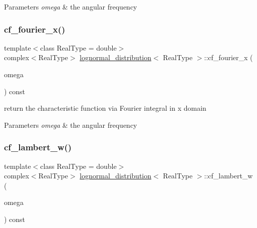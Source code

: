 \begin{DoxyParams}{Parameters}
{\em omega} & the angular frequency \\
\hline
\end{DoxyParams}
\mbox{\label{structlognormal__distribution_adace4ecb55c85b772702ec91a9f5b559}} 
\subsubsection{\texorpdfstring{cf\+\_\+fourier\+\_\+x()}{cf\_fourier\_x()}}
{\footnotesize\ttfamily template$<$class Real\+Type  = double$>$ \\
complex$<$Real\+Type$>$ \mbox{\hyperlink{structlognormal__distribution}{lognormal\+\_\+distribution}}$<$ Real\+Type $>$\+::cf\+\_\+fourier\+\_\+x (\begin{DoxyParamCaption}\item[{Real\+Type}]{omega }\end{DoxyParamCaption}) const\hspace{0.3cm}{\ttfamily [inline]}}



return the characteristic function via Fourier integral in x domain 


\begin{DoxyParams}{Parameters}
{\em omega} & the angular frequency \\
\hline
\end{DoxyParams}
\mbox{\label{structlognormal__distribution_ab0cead5567675a0ff6e3a3a5de1a1967}} 
\subsubsection{\texorpdfstring{cf\+\_\+lambert\+\_\+w()}{cf\_lambert\_w()}}
{\footnotesize\ttfamily template$<$class Real\+Type  = double$>$ \\
complex$<$Real\+Type$>$ \mbox{\hyperlink{structlognormal__distribution}{lognormal\+\_\+distribution}}$<$ Real\+Type $>$\+::cf\+\_\+lambert\+\_\+w (\begin{DoxyParamCaption}\item[{Real\+Type}]{omega }\end{DoxyParamCaption}) const\hspace{0.3cm}{\ttfamily [inline]}}




